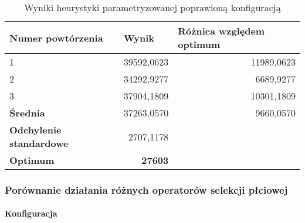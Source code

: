 \documentclass[./FM_mgr.tex]{subfiles}
\begin{document}
\begin{table}[h]
	\caption{Wyniki heurystyki parametryzowanej poprawioną konfiguracją \label{tsp_tweak_results}}
	\begin{tabular}{|l|r|r}
		\hline
		{\bf Numer powtórzenia}      & \multicolumn{1}{l|}{{\bf Wynik}} & \multicolumn{1}{l|}{{\bf Różnica względem optimum}} \\ \hline \hline
		1                            & 39592,0623                       & \multicolumn{1}{r|}{11989,0623}                     \\ \hline
		2                            & 34292,9277                       & \multicolumn{1}{r|}{6689,9277}                      \\ \hline
		3                            & 37904,1809                       & \multicolumn{1}{r|}{10301,1809}                     \\ \hline \hline
		{\bf Średnia}                & 37263,0570                       & \multicolumn{1}{r|}{9660,0570}                      \\ \hline
		{\bf Odchylenie standardowe} & 2707,1178                        &                                                     \\ \hhline{==~}
		{\bf Optimum}                & {\bf 27603}                      &                                                     \\ \cline{1-2}
	\end{tabular}
\end{table}


\subsubsection{Porównanie działania różnych operatorów selekcji płciowej}

\paragraph{Konfiguracja}
\end{document}
